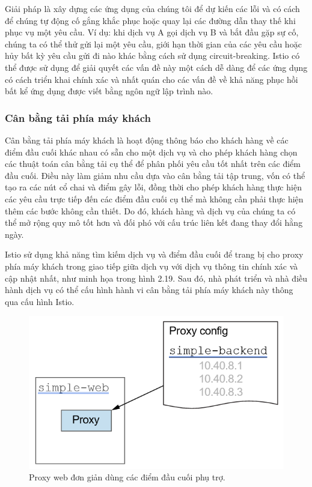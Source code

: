\documentclass[12pt,a4paper]{report}
\begin{document}
Giải pháp là xây dựng các ứng dụng của chúng tôi để dự kiến các lỗi và có cách để chúng tự động cố gắng khắc phục hoặc quay lại các đường dẫn thay thế khi phục vụ một yêu cầu. Ví dụ: khi dịch vụ A gọi dịch vụ B và bắt đầu gặp sự cố, chúng ta có thể thử gửi lại một yêu cầu, giới hạn thời gian của các yêu cầu hoặc hủy bất kỳ yêu cầu gửi đi nào khác bằng cách sử dụng circuit-breaking. Istio có thể được sử dụng để giải quyết các vấn đề này một cách dễ dàng để các ứng dụng có cách triển khai chính xác và nhất quán cho các vấn đề về khả năng phục hồi bất kể ứng dụng được viết bằng ngôn ngữ lập trình nào.

			\subsubsection{Cân bằng tải phía máy khách}
\hspace{0.6cm}Cân bằng tải phía máy khách là hoạt động thông báo cho khách hàng về các điểm đầu cuối khác nhau có sẵn cho một dịch vụ và cho phép khách hàng chọn các thuật toán cân bằng tải cụ thể để phân phối yêu cầu tốt nhất trên các điểm đầu cuối. Điều này làm giảm nhu cầu dựa vào cân bằng tải tập trung, vốn có thể tạo ra các nút cổ chai và điểm gây lỗi, đồng thời cho phép khách hàng thực hiện các yêu cầu trực tiếp đến các điểm đầu cuối cụ thể mà không cần phải thực hiện thêm các bước không cần thiết. Do đó, khách hàng và dịch vụ của chúng ta có thể mở rộng quy mô tốt hơn và đối phó với cấu trúc liên kết đang thay đổi hằng ngày.

Istio sử dụng khả năng tìm kiếm dịch vụ và điểm đầu cuối để trang bị cho proxy phía máy khách trong giao tiếp giữa dịch vụ với dịch vụ thông tin chính xác và cập nhật nhất, như minh họa trong hình 2.19. Sau đó, nhà phát triển và nhà điều hành dịch vụ có thể cấu hình hành vi cân bằng tải phía máy khách này thông qua cấu hình Istio.
\begin{figure}[h]
	\centering
	\includegraphics[width=0.7\linewidth]{Pics/2.2.3-p2}
	\caption{Proxy web đơn giản dùng các điểm đầu cuối phụ trợ.}
	\label{fig:2.2.3-2}
\end{figure}
\end{document}
